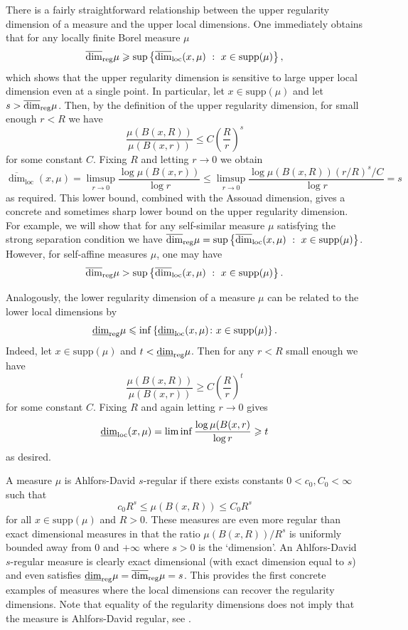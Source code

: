 There is a fairly straightforward relationship between the upper regularity dimension of a measure and the upper local dimensions. One immediately obtains that for any locally finite Borel measure $\mu$
\[
\overline{\dim}_{\textup{reg}} \mu \geqslant \sup \left\{ \overline{\dim}_{\text{loc}}(x,\mu) \ : \  x\in \text{supp}(\mu) \right\},
\]
which shows that the upper regularity dimension is sensitive to large upper local dimension even at a single point.  In particular, let $x \in \text{supp}(\mu)$ and let $s > \overline{\dim}_{\textup{reg}} \mu$.  Then, by the definition of the upper regularity dimension, for small enough $r < R$ we have
\[
\frac{\mu(B(x,R))}{\mu(B(x,r))} \leq C\left(\frac{R}{r}\right)^{s}
\]
for some constant $C$.  Fixing $R$ and letting $r \to 0$ we obtain
\[
\overline{\dim}_{\text{loc}}(x,\mu)=\limsup_{r\rightarrow 0} \frac{\log \mu(B(x,r))}{\log r} \leq  \limsup_{r\rightarrow 0} \frac{\log \mu(B(x,R)) (r/R)^s/C }{\log r}  = s
\]
as required. This lower bound, combined with the Assouad dimension, gives a concrete and sometimes sharp lower bound on the upper regularity dimension. For example, we will show that for any self-similar measure $\mu$ satisfying the strong separation condition we have $ \overline{\dim}_{\textup{reg}} \mu = \sup \left\{ \overline{\dim}_{\text{loc}}(x,\mu) \ : \  x\in \text{supp}(\mu) \right\}$.  However, for self-affine measures $\mu$, one may have
\[
\overline{\dim}_{\textup{reg}} \mu >  \sup \left\{ \overline{\dim}_{\text{loc}}(x,\mu) \ : \  x\in \text{supp}(\mu) \right\}.
\]

Analogously, the lower regularity dimension of a measure $\mu$ can be related to the lower local dimensions by 
\[
\underline{\dim}_{\textup{reg}} \mu \leqslant \inf \left\{\underline{\dim}_{\textup{loc}}(x,\mu) \colon x \in \text{supp}(\mu) \right\}.
\]
Indeed, let $x\in \text{supp}(\mu)$ and $t < \underline{\dim}_{\textup{reg}} \mu$. Then for any $r < R$ small enough we have
\[
\frac{\mu(B(x,R))}{\mu(B(x,r))} \geq C\left(\frac{R}{r}\right)^{t}
\]
for some constant $C$. Fixing $R$ and again letting $r \rightarrow 0$ gives
\[
\underline{\dim}_{\textup{loc}}(x,\mu) = \liminf \frac{\log \mu(B(x,r)}{\log r} \geqslant t
\]
as desired.

A measure $\mu$ is Ahlfors-David $s$-regular if there exists constants $0<c_0,C_0< \infty$ such that 
\[
c_0 R^s \le \mu(B(x,R)) \le C_0 R^s
\]
for all $x\in \text{supp}(\mu)$ and $R > 0$.
These measures are even more regular than exact dimensional measures in that the ratio $\mu(B(x,R))/R^s$ is uniformly bounded away from 0 and $+\infty$ where $s >0$ is the `dimension'.  An Ahlfors-David $s$-regular measure is clearly exact dimensional (with exact dimension equal to $s$) and even satisfies $\underline{\dim}_{\textup{reg}} \mu = \overline{\dim}_{\textup{reg}} \mu = s$. This provides the first concrete examples of measures where the local dimensions can recover the regularity dimensions. Note that equality of the regularity dimensions does not imply that the measure is Ahlfors-David regular, see \cite{hare-troscheit}.




